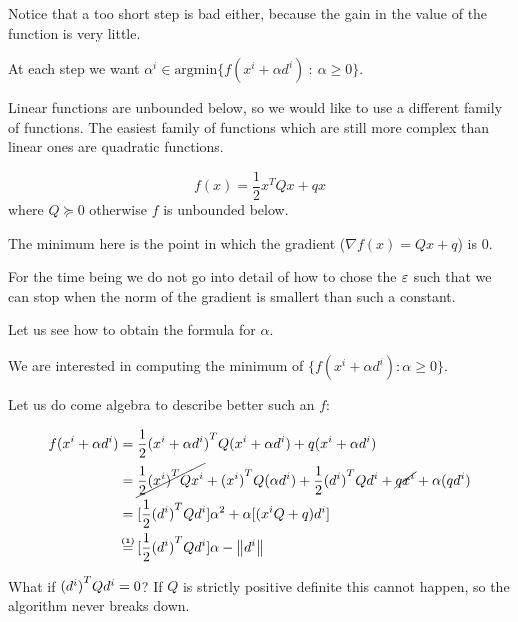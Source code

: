 \documentclass[computational_mathematics.tex]{subfiles}
\begin{document}
Notice that a too short step is bad either, because the gain in the value of the function is very little.

At each step we want $\alpha^i \in \mbox{argmin} \{f(x^i + \alpha d^i)~:~\alpha \geq 0\}$.

Linear functions are unbounded below, so we would like to use a different family of functions. The easiest family of functions which are still more complex than linear ones are quadratic functions.

\[
  f(x) = \frac{1}{2} x^T Q x + q x
\]
where $Q \succeq 0$ otherwise $f$ is unbounded below.

The minimum here is the point in which the gradient ($\nabla f(x) = Qx + q$) is $0$.


For the time being we do not go into detail of how to chose the $\varepsilon$ such that we can stop when the norm of the gradient is smallert than such a constant.

Let us see how to obtain the formula for $\alpha$.

We are interested in computing the minimum of $\{ f(x^i + \alpha d^i) : \alpha \ge 0\}$.

Let us do come algebra to describe better such an $f$:

\begin{equation}
  \begin{split}
    f(x^i + \alpha d^i) &= \frac{1}{2} \tr{(x^i + \alpha d^i)} Q (x^i + \alpha d^i) + q (x^i + \alpha d^i)\\
    &= \cancel{\frac{1}{2} \tr{(x^i)}Q x^i}  + \tr{(x^i)} Q (\alpha d^i) + \frac{1}{2} \tr{(d^i)} Q d^i + \cancel{q x^i} + \alpha (q d^i)\\
    &= [\frac{1}{2} \tr{(d^i)} Q d^i] \alpha^2  + \alpha [(x^i Q + q) d^i]\\
    &\numeq{(1)} [\frac{1}{2} \tr{(d^i)} Q d^i] \alpha  - \norm{d^i}\\
  \end{split}
\end{equation}

What if ${(d^i)}^{T} Q d^i = 0$? If $Q$ is strictly positive definite this cannot happen, so the algorithm never breaks down.
\end{document}
